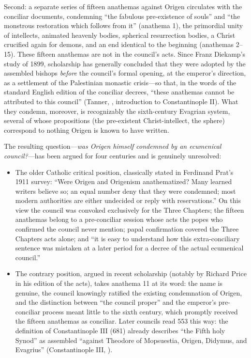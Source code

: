 Second: a separate series of fifteen anathemas against Origen circulates
with the conciliar documents, condemning ``the fabulous pre-existence of
souls'' and ``the monstrous restoration which follows from it'' (anathema
1), the primordial unity of intellects, animated heavenly bodies, spherical
resurrection bodies, a Christ crucified again for demons, and an end
identical to the beginning (anathemas 2--15). These fifteen anathemas are
not in the council's acts. Since Franz Diekamp's study of 1899, scholarship
has generally concluded that they were adopted by the assembled bishops
\emph{before} the council's formal opening, at the emperor's direction, as
a settlement of the Palestinian monastic crisis---so that, in the words of
the standard English edition of the conciliar decrees, ``these anathemas
cannot be attributed to this council'' (Tanner, , introduction to Constantinople II). What they
condemn, moreover, is recognizably the sixth-century Evagrian system,
several of whose propositions (the pre-existent Christ-intellect, the
sphere) correspond to nothing Origen is known to have written.

The resulting question---\emph{was Origen himself condemned by an
ecumenical council?}---has been argued for four centuries and is genuinely
unresolved:

\begin{itemize}
\item The older Catholic critical position, classically stated in
Ferdinand Prat's 1911 survey: ``Were Origen and Origenism anathematized?
Many learned writers believe so; an equal number deny that they were
condemned; most modern authorities are either undecided or reply with
reservations.'' On this view the council was convoked exclusively for the
Three Chapters; the fifteen anathemas belong to a pre-conciliar session
whose acts the popes who confirmed the council never mention; papal
confirmation covered the Three Chapters acts alone; and ``it is easy to
understand how this extra-conciliary sentence was mistaken at a later
period for a decree of the actual ecumenical council.''
\item The contrary position, argued in recent scholarship (notably by
Richard Price in his edition of the acts), takes anathema 11 at its word:
the name is genuine, the council knowingly ratified the existing
condemnation of Origen, and the distinction between ``the council proper''
and the emperor's pre-conciliar process meant little to the sixth century,
which promptly received the fifteen anathemas as conciliar. Later councils
read 553 this way: the definition of Constantinople III (681) already
describes ``the Fifth holy Synod'' as assembled ``against Theodore of
Mopsuestia, Origen, Didymus, and Evagrius'' (Constantinople III,
).
\end{itemize}

